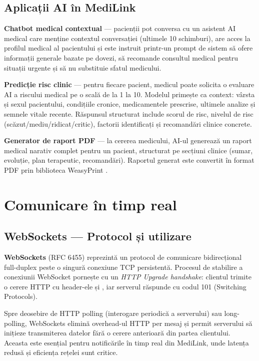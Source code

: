 \subsection{Aplicații AI în MediLink}

\textbf{Chatbot medical contextual} --- pacienții pot conversa cu un asistent AI medical care menține contextul conversației (ultimele 10 schimburi), are acces la profilul medical al pacientului și este instruit printr-un prompt de sistem să ofere informații generale bazate pe dovezi, să recomande consultul medical pentru situații urgente și să nu substituie sfatul medicului.

\textbf{Predicție risc clinic} --- pentru fiecare pacient, medicul poate solicita o evaluare AI a riscului medical pe o scală de la 1 la 10. Modelul primește ca context: vârsta și sexul pacientului, condițiile cronice, medicamentele prescrise, ultimele analize și semnele vitale recente. Răspunsul structurat include scorul de risc, nivelul de risc (scăzut/mediu/ridicat/critic), factorii identificați și recomandări clinice concrete.

\textbf{Generator de raport PDF} --- la cererea medicului, AI-ul generează un raport medical narativ complet pentru un pacient, structurat pe secțiuni clinice (sumar, evoluție, plan terapeutic, recomandări). Raportul generat este convertit în format PDF prin biblioteca WeasyPrint \cite{weasyprint2024}.

\section{Comunicare în timp real}

\subsection{WebSockets --- Protocol și utilizare}

\textbf{WebSockets} \cite{rfc6455} (RFC 6455) reprezintă un protocol de comunicare bidirecțional full-duplex peste o singură conexiune TCP persistentă. Procesul de stabilire a conexiunii WebSocket pornește cu un \textit{HTTP Upgrade handshake}: clientul trimite o cerere HTTP cu header-ele  și , iar serverul răspunde cu codul 101 (Switching Protocols).

Spre deosebire de HTTP polling (interogare periodică a serverului) sau long-polling, WebSockets elimină overhead-ul HTTP per mesaj și permit serverului să inițieze transmiterea datelor fără o cerere anterioară din partea clientului. Aceasta este esențial pentru notificările în timp real din MediLink, unde latența redusă și eficiența rețelei sunt critice.

